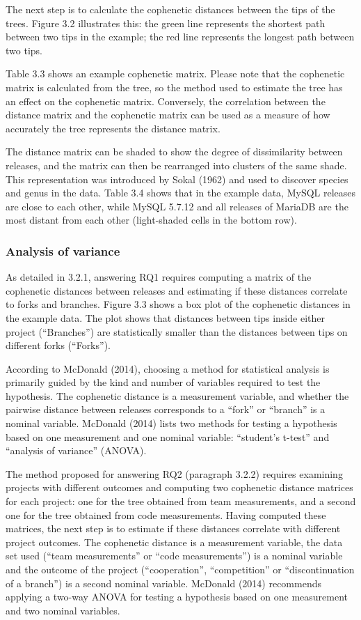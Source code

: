The next step is to calculate the cophenetic distances between the tips of the trees. Figure 3.2 illustrates this: the green line represents the shortest path between two tips in the example; the red line represents the longest path between two tips.

Table 3.3 shows an example cophenetic matrix. Please note that the cophenetic matrix is calculated from the tree, so the method used to estimate the tree has an effect on the cophenetic matrix. Conversely, the correlation between the distance matrix and the cophenetic matrix can be used as a measure of how accurately the tree represents the distance matrix.

The distance matrix can be shaded to show the degree of dissimilarity between releases, and the matrix can then be rearranged into clusters of the same shade. This representation was introduced by Sokal (1962) and used to discover species and genus in the data. Table 3.4 shows that in the example data, MySQL releases are close to each other, while MySQL 5.7.12 and all releases of MariaDB are the most distant from each other (light-shaded cells in the bottom row).

\subsubsection{Analysis of variance}
As detailed in 3.2.1, answering RQ1 requires computing a matrix of the cophenetic distances between releases and estimating if these distances correlate to forks and branches. Figure 3.3 shows a box plot of the cophenetic distances in the example data. The plot shows that distances between tips inside either project (“Branches”) are statistically smaller than the distances between tips on different forks (“Forks”).

According to McDonald (2014), choosing a method for statistical analysis is primarily guided by the kind and number of variables required to test the hypothesis. The cophenetic distance is a measurement variable, and whether the pairwise distance between releases corresponds to a “fork” or “branch” is a nominal variable. McDonald (2014) lists two methods for testing a hypothesis based on one measurement and one nominal variable: “student's t-test” and “analysis of variance” (ANOVA).

The method proposed for answering RQ2 (paragraph 3.2.2) requires examining projects with different outcomes and computing two cophenetic distance matrices for each project: one for the tree obtained from team measurements, and a second one for the tree obtained from code measurements. Having computed these matrices, the next step is to estimate if these distances correlate with different project outcomes. The cophenetic distance is a measurement variable, the data set used (“team measurements” or “code measurements”) is a nominal variable and the outcome of the project (“cooperation”, “competition” or “discontinuation of a branch”) is a second nominal variable. McDonald (2014) recommends applying a two-way ANOVA for testing a hypothesis based on one measurement and two nominal variables.

